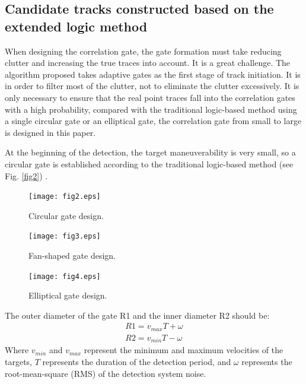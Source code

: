 \documentclass[default,iicol]{sn-jnl}%
\theoremstyle{thmstyleone}%
\theoremstyle{thmstyletwo}%
\theoremstyle{thmstylethree}%
\begin{document}
\subsection{Candidate tracks constructed based on the extended logic method}\label{subsec2}

When designing the correlation gate, the gate formation must take reducing clutter and increasing the true traces into account. It is a great challenge. The algorithm proposed takes adaptive gates as the first stage of track initiation. It is in order to filter most of the clutter, not to eliminate the clutter excessively. It is only necessary to ensure that the real point traces fall into the correlation gates with a high probability, compared with the traditional logic-based method using a single circular gate or an elliptical gate, the correlation gate from small to large is designed in this paper.

At the beginning of the detection, the target maneuverability is very small, so a circular gate is established according to the traditional logic-based method (see Fig. \ref{fig2}) \cite{bib16}.
\begin{figure}%
    \setlength{\abovecaptionskip}{5pt}
    \setlength{\belowcaptionskip}{10pt}
    \begin{minipage}[b]{0.33\textwidth}
        \texttt{[image: fig2.eps]}
        \caption{Circular gate design.}
        \label{fig2}
    \end{minipage}
    \begin{minipage}[b]{0.33\textwidth}
        \texttt{[image: fig3.eps]}
        \caption{Fan-shaped gate design.}\label{fig3}
    \end{minipage}
    \begin{minipage}[b]{0.33\textwidth}
        \texttt{[image: fig4.eps]}
        \caption{Elliptical gate design.}\label{fig4}
    \end{minipage}
\end{figure}
The outer diameter of the gate R1 and the inner diameter R2 should be:
\begin{equation}
    \left. \begin{array}  { l  }  { R 1 = v _ { m a x } T + \omega } \\ { R 2 = v _ { m i n } T - \omega } \end{array} \right.
    \label{eq1}
\end{equation}
Where $v _ { m i n }$  and  $v _ { m a x }$ represent the minimum and maximum velocities of the targets, $T$ represents the duration of the detection period, and $\omega$ represents the root-mean-square (RMS) of the detection system noise.
\end{document}
